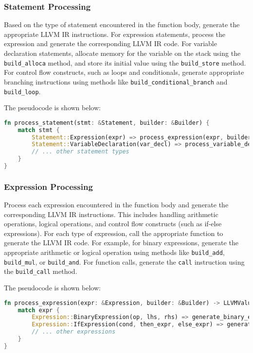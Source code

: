 \subsubsection*{Statement Processing}

Based on the type of statement encountered in the function body, generate the appropriate LLVM IR instructions. For expression statements, process the expression and generate the corresponding LLVM IR code. For variable declaration statements, allocate memory for the variable on the stack using the \texttt{build\_alloca} method, and store its initial value using the \texttt{build\_store} method. For control flow constructs, such as loops and conditionals, generate appropriate branching instructions using methods like \texttt{build\_conditional\_branch} and \texttt{build\_loop}.

The pseudocode is shown below:

\begin{lstlisting}[language=Rust]
fn process_statement(stmt: &Statement, builder: &Builder) {
    match stmt {
        Statement::Expression(expr) => process_expression(expr, builder),
        Statement::VariableDeclaration(var_decl) => process_variable_declaration(var_decl, builder),
        // ... other statement types
    }
}
\end{lstlisting}

\subsubsection*{Expression Processing}

Process each expression encountered in the function body and generate the corresponding LLVM IR instructions. This includes handling arithmetic operations, logical operations, and control flow constructs (such as if-else expressions). For each type of expression, call the appropriate function to generate the LLVM IR code. For example, for binary expressions, generate the appropriate arithmetic or logical operation using methods like \texttt{build\_add}, \texttt{build\_mul}, or \texttt{build\_and}. For function calls, generate the \texttt{call} instruction using the \texttt{build\_call} method.


The pseudocode is shown below:

\begin{lstlisting}[language=Rust]
fn process_expression(expr: &Expression, builder: &Builder) -> LLVMValue {
    match expr {
        Expression::BinaryExpression(op, lhs, rhs) => generate_binary_expression(op, lhs, rhs, builder),
        Expression::IfExpression(cond, then_expr, else_expr) => generate_if_expression(cond, then_expr, else_expr, builder),
        // ... other expressions
    }
}
\end{lstlisting}

